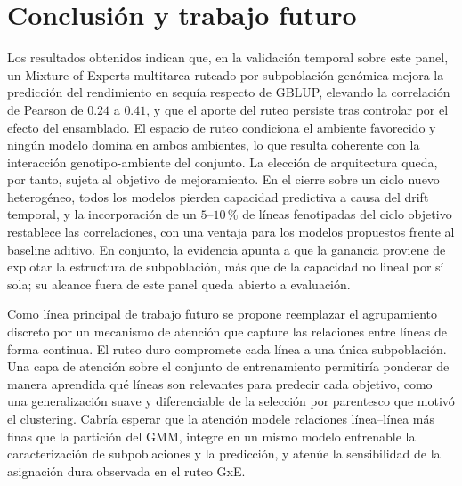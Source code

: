 \documentclass[conference]{IEEEtran}
\begin{document}
\section{Conclusión y trabajo futuro}
Los resultados obtenidos indican que, en la validación temporal sobre este panel, un Mixture-of-Experts multitarea ruteado por subpoblación genómica mejora la predicción del rendimiento en sequía respecto de GBLUP, elevando la correlación de Pearson de $0.24$ a $0.41$, y que el aporte del ruteo persiste tras controlar por el efecto del ensamblado. El espacio de ruteo condiciona el ambiente favorecido y ningún modelo domina en ambos ambientes, lo que resulta coherente con la interacción genotipo-ambiente del conjunto. La elección de arquitectura queda, por tanto, sujeta al objetivo de mejoramiento. En el cierre sobre un ciclo nuevo heterogéneo, todos los modelos pierden capacidad predictiva a causa del drift temporal, y la incorporación de un $5$--$10\,\%$ de líneas fenotipadas del ciclo objetivo restablece las correlaciones, con una ventaja para los modelos propuestos frente al baseline aditivo. En conjunto, la evidencia apunta a que la ganancia proviene de explotar la estructura de subpoblación, más que de la capacidad no lineal por sí sola; su alcance fuera de este panel queda abierto a evaluación.

Como línea principal de trabajo futuro se propone reemplazar el agrupamiento discreto por un mecanismo de atención que capture las relaciones entre líneas de forma continua. El ruteo duro compromete cada línea a una única subpoblación. Una capa de atención sobre el conjunto de entrenamiento permitiría ponderar de manera aprendida qué líneas son relevantes para predecir cada objetivo, como una generalización suave y diferenciable de la selección por parentesco que motivó el clustering. Cabría esperar que la atención modele relaciones línea--línea más finas que la partición del GMM, integre en un mismo modelo entrenable la caracterización de subpoblaciones y la predicción, y atenúe la sensibilidad de la asignación dura observada en el ruteo GxE.
\end{document}
